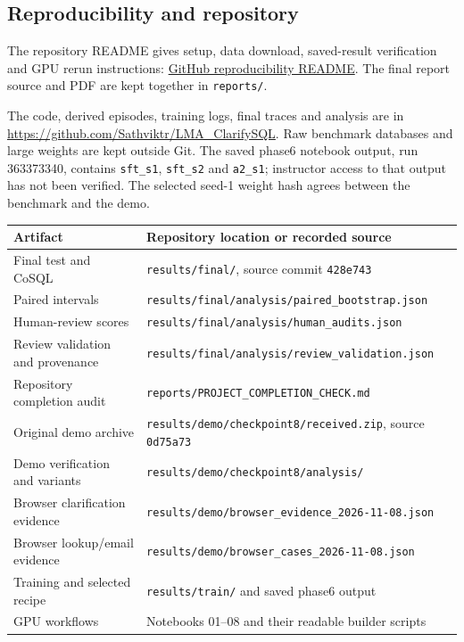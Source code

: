 \documentclass[11pt,a4paper]{article}
\newcommand{\repo}{https://github.com/Sathviktr/LMA_ClarifySQL}
\newcommand{\file}[1]{\nolinkurl{#1}}
\begin{document}
\subsection{Reproducibility and repository}

The repository README gives setup, data download, saved-result verification and GPU rerun instructions:
\href{https://github.com/Sathviktr/LMA_ClarifySQL#reproducibility}{GitHub reproducibility README}.
The final report source and PDF are kept together in \file{reports/}.

The code, derived episodes, training logs, final traces and analysis are in \url{\repo}. Raw benchmark
databases and large weights are kept outside Git. The saved phase6 notebook output, run 363373340,
contains \file{sft_s1}, \file{sft_s2} and \file{a2_s1}; instructor access to that output has not been verified.
The selected seed-1 weight hash agrees between the benchmark and the demo.

\begin{tabularx}{\linewidth}{@{}lY@{}}
\toprule
Artifact & Repository location or recorded source \\
\midrule
Final test and CoSQL & \file{results/final/}, source commit \file{428e743} \\
Paired intervals & \file{results/final/analysis/paired_bootstrap.json} \\
Human-review scores & \file{results/final/analysis/human_audits.json} \\
Review validation and provenance & \file{results/final/analysis/review_validation.json} \\
Repository completion audit & \file{reports/PROJECT_COMPLETION_CHECK.md} \\
Original demo archive & \file{results/demo/checkpoint8/received.zip}, source \file{0d75a73} \\
Demo verification and variants & \file{results/demo/checkpoint8/analysis/} \\
Browser clarification evidence & \file{results/demo/browser_evidence_2026-11-08.json} \\
Browser lookup/email evidence & \file{results/demo/browser_cases_2026-11-08.json} \\
Training and selected recipe & \file{results/train/} and saved phase6 output \\
GPU workflows & Notebooks 01--08 and their readable builder scripts \\
\bottomrule
\end{tabularx}
\end{document}
